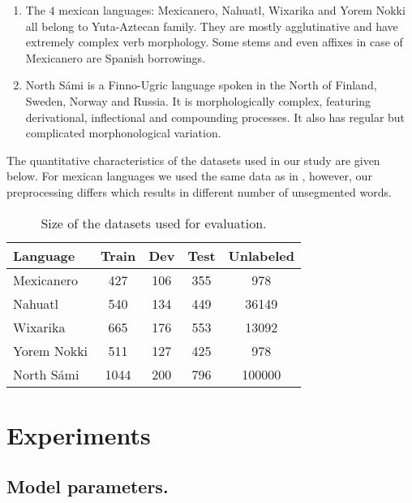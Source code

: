 \documentclass[11pt,a4paper]{article}
\begin{document}
\begin{enumerate}
	\item The $4$ mexican languages: Mexicanero, Nahuatl, Wixarika and Yorem Nokki all belong to Yuta-Aztecan family. They are mostly agglutinative and have extremely complex verb morphology. Some stems and even affixes in case of Mexicanero are Spanish borrowings.
	\item North S\'ami is a Finno-Ugric language spoken in the North of Finland, Sweden, Norway and Russia. It is morphologically complex, featuring derivational, inflectional and compounding processes. It also has regular but complicated morphonological variation.
\end{enumerate}

The quantitative characteristics of the datasets used in our study are given below. For mexican languages we used the same data as in , however, our preprocessing differs which results in different number of unsegmented words.

\begin{table*}[h!]
	\centering
	\begin{tabular}{|l|ccc|c|}
		\hline
		Language & Train & Dev & Test & Unlabeled \\
		\hline
		Mexicanero & 427 & 106 & 355 & 978\footnotemark[1]\\
		Nahuatl & 540 & 134 & 449 &   36149 \\
		Wixarika & 665 & 176 & 553 &  13092 \\
		Yorem Nokki & 511 & 127 & 425 & 978\footnotemark[1] \\
		\hline
		North S\'ami & 1044 & 200 & 796 & 100000\footnotemark[2] \\
		\hline
	\end{tabular}
	\caption{Size of the datasets used for evaluation.}
	
\end{table*}
\section{Experiments}

\subsection{Model parameters.}
\end{document}
